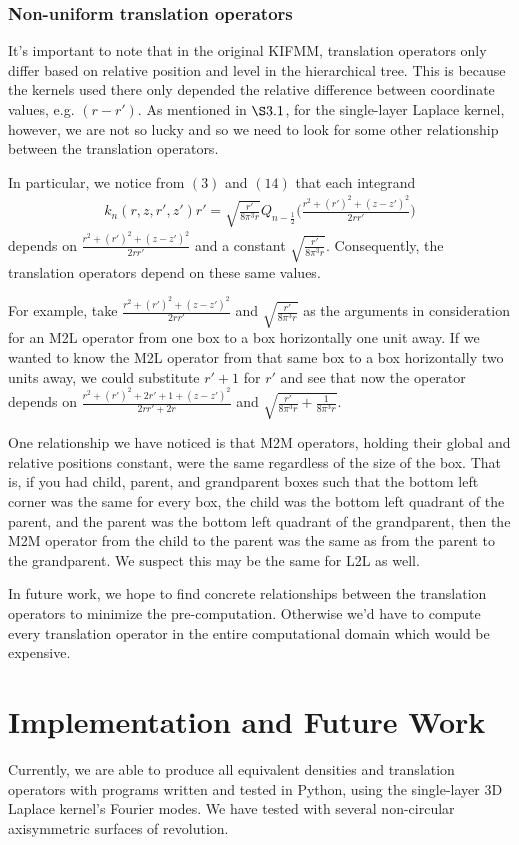 \documentclass[12pt,letterpaper]{article}
\begin{document}
\subsubsection{Non-uniform translation operators}
It's important to note that in the original KIFMM, translation operators only differ based on relative position and level in the hierarchical tree. This is because the kernels used there only depended the relative difference between coordinate values, e.g. $(r-r')$. As mentioned in $\S3.1$, for the single-layer Laplace kernel, however, we are not so lucky and so we need to look for some other relationship between the translation operators.

In particular, we notice from $(3)$ and $(14)$ that each integrand
\begin{align}
k_n(r,z,r',z')r'=\sqrt{\frac{r'}{8\pi^3r}}Q_{n-\frac{1}{2}}\bigg(\frac{r^2+(r')^2+(z-z')^2}{2rr'}\bigg)
\end{align}
depends on $\frac{r^2+(r')^2+(z-z')^2}{2rr'}$ and a constant $\sqrt{\frac{r'}{8\pi^3r}}$. Consequently, the translation operators depend on these same values.

For example, take $\frac{r^2+(r')^2+(z-z')^2}{2rr'}$ and $\sqrt{\frac{r'}{8\pi^3r}}$ as the arguments in consideration for an M2L operator from one box to a box horizontally one unit away. If we wanted to know the M2L operator from that same box to a box horizontally two units away, we could substitute $r'+1$ for $r'$ and see that now the operator depends on $\frac{r^2+(r')^2+2r'+1+(z-z')^2}{2rr'+2r}$ and $\sqrt{\frac{r'}{8\pi^3r}+\frac{1}{8\pi^3r}}$. 

One relationship we have noticed is that M2M operators, holding their global and relative positions constant, were the same regardless of the size of the box. That is, if you had child, parent, and grandparent boxes such that the bottom left corner was the same for every box, the child was the bottom left quadrant of the parent, and the parent was the bottom left quadrant of the grandparent, then the M2M operator from the child to the parent was the same as from the parent to the grandparent. We suspect this may be the same for L2L as well.

In future work, we hope to find concrete relationships between the translation operators to minimize the pre-computation. Otherwise we'd have to compute every translation operator in the entire computational domain which would be expensive.

\section{Implementation and Future Work}
Currently, we are able to produce all equivalent densities and translation operators with programs written and tested in Python, using the single-layer 3D Laplace kernel's Fourier modes. We have tested with several non-circular axisymmetric surfaces of revolution.
\end{document}
